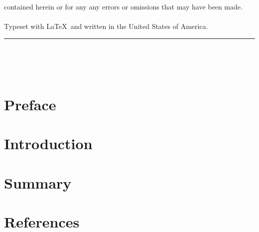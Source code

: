 \documentclass[
  letterpaper,
  10pt,
  reqno,
  twopage,
  openany]{book}
\newlength{\cslhangindent}
\newlength{\cslentryspacingunit} %
\newenvironment{CSLReferences}[2] %
 {%
  \setlength{\parindent}{0pt}
  \ifodd #1
  \let\oldpar\par
  \def\par{\hangindent=\cslhangindent\oldpar}
  \fi
  \setlength{\parskip}{#2\cslentryspacingunit}
 }%
 {}
\newcommand{\HRule}{\rule{\linewidth}{0.5mm}}
\begin{document}
\begin{titlepage}
contained herein or for any any errors or omissions that may have been made.  \\ \\  
Typeset with \LaTeX \, and written in the United States of America.  
\\[2pt] \HRule \\[0.5cm]  \authname \\ \cred \\ \website
\end{titlepage}



\ifdefined\Shaded\renewenvironment{Shaded}{\begin{tcolorbox}[breakable, enhanced, frame hidden, sharp corners, interior hidden, borderline west={3pt}{0pt}{shadecolor}, boxrule=0pt]}{\end{tcolorbox}}\fi

\mainmatter
{}

\hypertarget{preface}{%
\chapter*{Preface}\label{preface}}



\hypertarget{introduction}{%
\chapter{Introduction}\label{introduction}}


\hypertarget{summary}{%
\chapter{Summary}\label{summary}}


\hypertarget{references}{%
\chapter*{References}\label{references}}


\hypertarget{refs}{}
\begin{CSLReferences}{0}{0}
\end{CSLReferences}


\backmatter


\printindex
\end{document}
